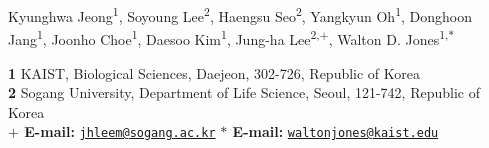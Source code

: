 Kyunghwa Jeong\textsuperscript{1},
Soyoung Lee\textsuperscript{2},
Haengsu Seo\textsuperscript{2},
Yangkyun Oh\textsuperscript{1},
Donghoon Jang\textsuperscript{1},
Joonho Choe\textsuperscript{1},
Daesoo Kim\textsuperscript{1},
Jung-ha Lee\textsuperscript{2,$+$},
Walton D. Jones\textsuperscript{1,$\ast$}

{\bf 1} KAIST, Biological Sciences, Daejeon, 302-726, Republic of Korea
\\
{\bf 2} Sogang University, Department of Life Science, Seoul, 121-742, Republic of Korea
\\
{\bf $+$ E-mail:} \href{mailto:jhleem@sogang.ac.kr}{\nolinkurl{jhleem@sogang.ac.kr}}
{\bf $\ast$ E-mail:} \href{mailto:waltonjones@kaist.edu}{\nolinkurl{waltonjones@kaist.edu}}
